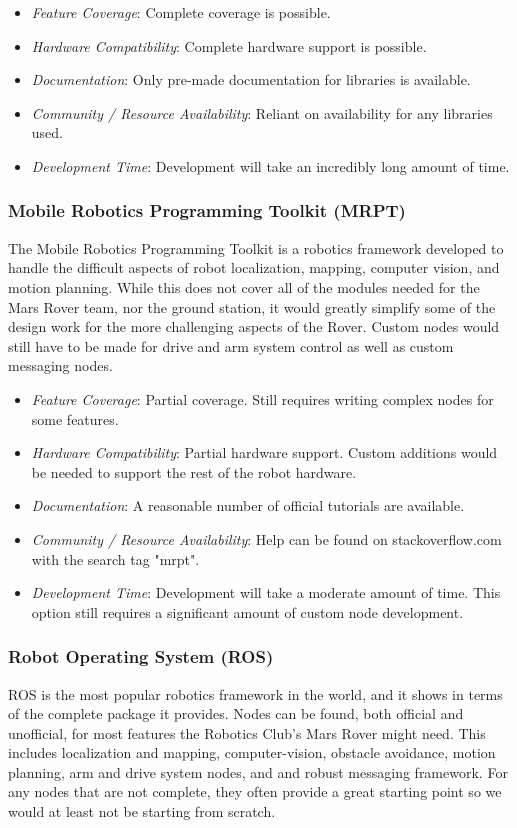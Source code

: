 \documentclass[onecolumn, draftclsnofoot, 10pt, compsoc]{IEEEtran}
\begin{document}
\begin{itemize}
\item \textit{Feature Coverage}: Complete coverage is possible.
\item \textit{Hardware Compatibility}: Complete hardware support is possible.
\item \textit{Documentation}: Only pre-made documentation for libraries is available.
\item \textit{Community / Resource Availability}: Reliant on availability for any libraries used.
\item \textit{Development Time}: Development will take an incredibly long amount of time.
\end{itemize}

\subsubsection{Mobile Robotics Programming Toolkit (MRPT)}
The Mobile Robotics Programming Toolkit is a robotics framework developed to handle the difficult aspects of robot localization, mapping, computer vision, and motion planning. 
While this does not cover all of the modules needed for the Mars Rover team, nor the ground station, it would greatly simplify some of the design work for the more challenging aspects of the Rover. 
Custom nodes would still have to be made for drive and arm system control as well as custom messaging nodes.

\begin{itemize}
\item \textit{Feature Coverage}: Partial coverage.
Still requires writing complex nodes for some features.
\item \textit{Hardware Compatibility}: Partial hardware support.
Custom additions would be needed to support the rest of the robot hardware.
\item \textit{Documentation}: A reasonable number of official tutorials are available.
\item \textit{Community / Resource Availability}: Help can be found on stackoverflow.com with the search tag "mrpt".
\item \textit{Development Time}: Development will take a moderate amount of time.
This option still requires a significant amount of custom node development.
\end{itemize}


\subsubsection{Robot Operating System (ROS)}
ROS is the most popular robotics framework in the world, and it shows in terms of the complete package it provides. 
Nodes can be found, both official and unofficial, for most features the Robotics Club's Mars Rover might need.
This includes localization and mapping, computer-vision, obstacle avoidance, motion planning, arm and drive system nodes, and and robust messaging framework.
For any nodes that are not complete, they often provide a great starting point so we would at least not be starting from scratch.
\end{document}
